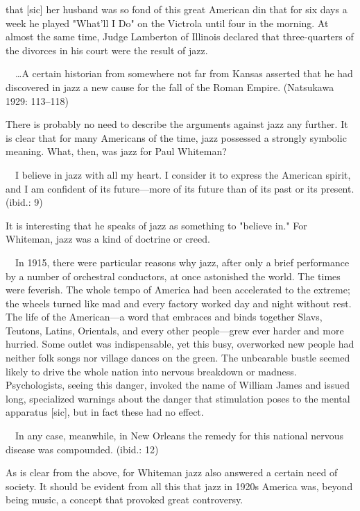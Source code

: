 \begin{gquote}
that [sic] her husband was so fond of this great American din that for six days a week he played "What'll I Do" on the Victrola until four in the morning. At almost the same time, Judge Lamberton of Illinois declared that three-quarters of the divorces in his court were the result of jazz.\par{}　…A certain historian from somewhere not far from Kansas asserted that he had discovered in jazz a new cause for the fall of the Roman Empire. (Natsukawa 1929: 113–118)
\end{gquote}

There is probably no need to describe the arguments against jazz any further. It is clear that for many Americans of the time, jazz possessed a strongly symbolic meaning. What, then, was jazz for Paul Whiteman?

\begin{gquote}
　I believe in jazz with all my heart. I consider it to express the American spirit, and I am confident of its future—more of its future than of its past or its present. (ibid.: 9)
\end{gquote}

It is interesting that he speaks of jazz as something to "believe in." For Whiteman, jazz was a kind of doctrine or creed.

\begin{gquote}
　In 1915, there were particular reasons why jazz, after only a brief performance by a number of orchestral conductors, at once astonished the world. The times were feverish. The whole tempo of America had been accelerated to the extreme; the wheels turned like mad and every factory worked day and night without rest. The life of the American—a word that embraces and binds together Slavs, Teutons, Latins, Orientals, and every other people—grew ever harder and more hurried. Some outlet was indispensable, yet this busy, overworked new people had neither folk songs nor village dances on the green. The unbearable bustle seemed likely to drive the whole nation into nervous breakdown or madness. Psychologists, seeing this danger, invoked the name of William James and issued long, specialized warnings about the danger that stimulation poses to the mental apparatus [sic], but in fact these had no effect.\par{}　In any case, meanwhile, in New Orleans the remedy for this national nervous disease was compounded. (ibid.: 12)
\end{gquote}

As is clear from the above, for Whiteman jazz also answered a certain need of society. It should be evident from all this that jazz in 1920s America was, beyond being music, a concept that provoked great controversy.

